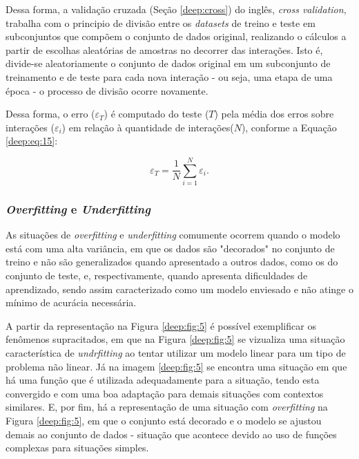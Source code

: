 Dessa forma, a validação cruzada (Seção \ref{deep:cross}) do inglês, \textit{cross validation}, trabalha com o principio de divisão entre os \textit{datasets} de treino e teste em subconjuntos que compõem o conjunto de dados original, realizando o cálculos a partir de escolhas aleatórias de amostras no decorrer das interações. Isto é, divide-se aleatoriamente o conjunto de dados original em um subconjunto de treinamento e de teste para cada nova interação - ou seja, uma etapa de uma época - o processo de divisão ocorre novamente.

Dessa forma, o erro ($\varepsilon_T$) é computado do teste ($T$) pela média dos erros sobre interações ($\varepsilon_i$) em relação à quantidade de interações($N$), conforme a Equação \ref{deep:eq:15}:

\begin{equation}
    \label{deep:eq:15}
    \varepsilon_T = \frac{1}{N} \sum_{i=1}^{N} \varepsilon_i.
\end{equation}


\subsubsection{\textit{Overfitting} e \textit{Underfitting}}
\label{deep:overunder}

As situações de \textit{overfitting} e \textit{underfitting} comumente ocorrem quando o modelo está com uma alta variância, em que os dados são "decorados" no conjunto de treino e não são generalizados quando apresentado a outros dados, como os do conjunto de teste, e, respectivamente, quando apresenta dificuldades de aprendizado, sendo assim caracterizado como um modelo enviesado e não atinge o mínimo de acurácia necessária.

A partir da representação na Figura \ref{deep:fig:5} é possível exemplificar os fenômenos supracitados, em que na Figura \ref{deep:fig:5} se vizualiza uma situação característica de \textit{undrfitting} ao tentar utilizar um modelo linear para um tipo de problema não linear. Já na imagem \ref{deep:fig:5} se encontra uma situação em que há uma função que é utilizada adequadamente para a situação, tendo esta convergido e com uma boa adaptação para demais situações com contextos similares. E, por fim, há a representação de uma situação com \textit{overfitting} na Figura \ref{deep:fig:5}, em que o conjunto está decorado e o modelo se ajustou demais ao conjunto de dados - situação que acontece devido ao uso de funções complexas para situações simples.

